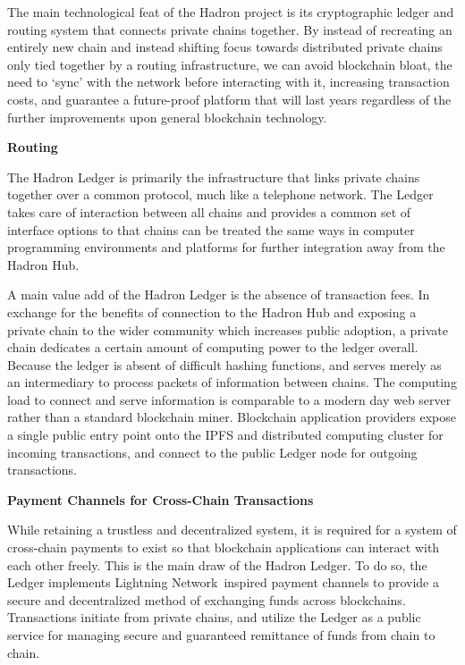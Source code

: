 \documentclass{%
	article}
\begin{document}
The main technological feat of the Hadron project is its cryptographic ledger and routing system that connects private chains together. By instead of recreating an entirely new chain and instead shifting focus towards distributed private chains only tied together by a routing infrastructure, we can avoid blockchain bloat, the need to ‘sync’ with the network before interacting with it, increasing transaction costs, and guarantee a future-proof platform that will last years regardless of the further improvements upon general blockchain technology.

\begin{center}
\textbf{Routing}
\end{center}

The Hadron Ledger is primarily the infrastructure that links private chains together over a common protocol, much like a telephone network. The Ledger takes care of interaction between all chains and provides a common set of interface options to that chains can be treated the same ways in computer programming environments and platforms for further integration away from the Hadron Hub.

A main value add of the Hadron Ledger is the absence of transaction fees. In exchange for the benefits of connection to the Hadron Hub and exposing a private chain to the wider community which increases public adoption, a private chain dedicates a certain amount of computing power to the ledger overall. Because the ledger is absent of difficult hashing functions, and serves merely as an intermediary to process packets of information between chains. The computing load to connect and serve information is comparable to a modern day web server rather than a standard blockchain miner. Blockchain application providers expose a single public entry point onto the IPFS and distributed computing cluster for incoming transactions, and connect to the public Ledger node for outgoing transactions.

\begin{center}
\textbf{Payment Channels for Cross-Chain Transactions}
\end{center}

While retaining a trustless and decentralized system, it is required for a system of cross-chain payments to exist so that blockchain applications can interact with each other freely. This is the main draw of the Hadron Ledger. To do so, the Ledger implements Lightning Network\,\cite{lightning} inspired payment channels to provide a secure and decentralized method of exchanging funds across blockchains. Transactions initiate from private chains, and utilize the Ledger as a public service for managing secure and guaranteed remittance of funds from chain to chain.
\end{document}
